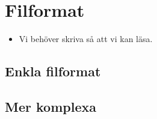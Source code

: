 \section{Filformat}

\begin{frame}[fragile]
  \begin{remark}
    \begin{itemize}
      \item Vi behöver skriva så att vi kan läsa.
    \end{itemize}
  \end{remark}
\end{frame}

\subsection{Enkla filformat}

\begin{frame}[fragile]
  \begin{example}[xy.py]
    
  \end{example}
\end{frame}

\begin{frame}[fragile]
  \begin{example}[xy.py]
    
  \end{example}
\end{frame}

\subsection{Mer komplexa}


